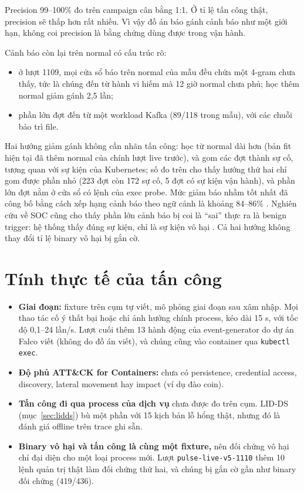 Precision 99--100\% đo trên campaign cân bằng 1:1. Ở tỉ lệ tấn công thật, precision sẽ thấp hơn rất nhiều. Vì vậy đồ án báo gánh cảnh báo như một giới hạn, không coi precision là bằng chứng dùng được trong vận hành.

Cảnh báo còn lại trên normal có cấu trúc rõ:

\begin{itemize}
\tightlist
\item
  ở lượt 1109, mọi cửa sổ báo trên normal của mẫu đều chứa một 4-gram chưa thấy, tức là chúng đến từ hành vi hiếm mà 12 giờ normal chưa phủ; học thêm normal giảm gánh 2,5 lần;
\item
  phần lớn đợt đến từ một workload Kafka (89/118 trong mẫu), với các chuỗi bảo trì file.
\end{itemize}

Hai hướng giảm gánh không cần nhãn tấn công: học từ normal dài hơn (bản fit hiện tại đã thêm normal của chính lượt live trước), và gom các đợt thành sự cố, tương quan với sự kiện của Kubernetes; số đo trên cho thấy hướng thứ hai chỉ gom được phần nhỏ (223 đợt còn 172 sự cố, 5 đợt có sự kiện vận hành), và phần lớn đợt nằm ở cửa sổ có lệnh của exec probe. Mức giảm báo nhầm tốt nhất đã công bố bằng cách xếp hạng cảnh báo theo ngữ cảnh là khoảng 84--86\% \citep{hassan2019}. Nghiên cứu về SOC cũng cho thấy phần lớn cảnh báo bị coi là ``sai'' thực ra là benign trigger: hệ thống thấy đúng sự kiện, chỉ là sự kiện vô hại \citep{alahmadi2022}. Cả hai hướng không thay đổi tỉ lệ binary vô hại bị gắn cờ.

\section{Tính thực tế của tấn công}

\begin{itemize}
\tightlist
\item
  \textbf{Giai đoạn:} fixture trên cụm tự viết, mô phỏng giai đoạn sau xâm nhập. Mọi thao tác cố ý thất bại hoặc chỉ ảnh hưởng chính process, kéo dài 15 s, với tốc độ 0,1--24 lần/s. Lượt cuối thêm 13 hành động của event-generator do dự án Falco viết (không do đồ án viết), và chúng cũng vào container qua \texttt{kubectl exec}.
\item
  \textbf{Độ phủ ATT\&CK for Containers:} chưa có persistence, credential access, discovery, lateral movement hay impact (ví dụ đào coin).
\item
  \textbf{Tấn công đi qua process của dịch vụ} chưa được đo trên cụm. LID-DS (mục~\ref{sec:lidds}) bù một phần với 15 kịch bản lỗ hổng thật, nhưng đó là đánh giá offline trên trace ghi sẵn.
\item
  \textbf{Binary vô hại và tấn công là cùng một fixture,} nên đối chứng vô hại chỉ đại diện cho một loại process mới. Lượt \texttt{pulse-\allowbreak{}live-\allowbreak{}v5-\allowbreak{}1110} thêm 10 lệnh quản trị thật làm đối chứng thứ hai, và chúng bị gắn cờ gần như binary đối chứng (419/436).
\end{itemize}

